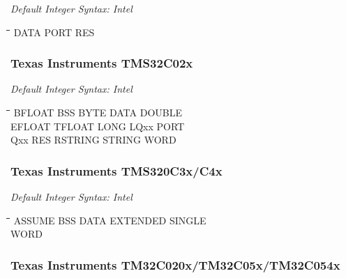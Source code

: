 {\em Default Integer Syntax: Intel}

{\tt\begin{tabbing}
\hspace{3cm}\=\hspace{3cm}\=\hspace{3cm}\=\hspace{3cm}\=\kill
DATA       \> PORT        \> RES \\
\end{tabbing}}

\subsubsection{Texas Instruments TMS32C02x}

{\em Default Integer Syntax: Intel}

{\tt\begin{tabbing}
\hspace{3cm}\=\hspace{3cm}\=\hspace{3cm}\=\hspace{3cm}\=\kill
BFLOAT     \> BSS         \> BYTE        \> DATA        \> DOUBLE \\ 
EFLOAT     \> TFLOAT      \> LONG        \> LQxx        \> PORT \\
Qxx        \> RES         \> RSTRING     \> STRING      \> WORD \\
\end{tabbing}}

\subsubsection{Texas Instruments TMS320C3x/C4x}

{\em Default Integer Syntax: Intel}

{\tt\begin{tabbing}
\hspace{3cm}\=\hspace{3cm}\=\hspace{3cm}\=\hspace{3cm}\=\kill
ASSUME     \> BSS         \> DATA        \> EXTENDED    \> SINGLE \\
WORD \\
\end{tabbing}}

\subsubsection{Texas Instruments TM32C020x/TM32C05x/TM32C054x}

